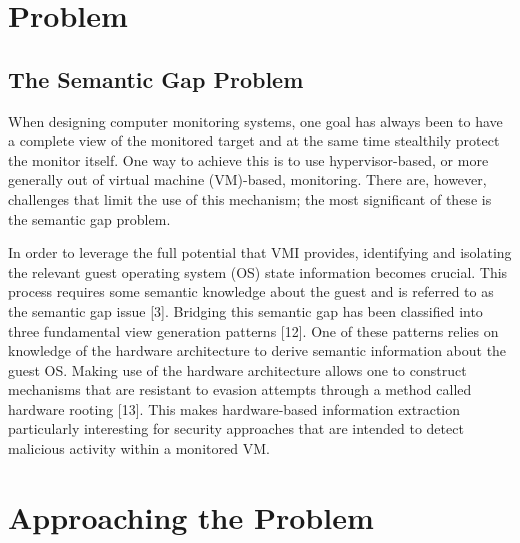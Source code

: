 \documentclass{report}
\begin{document}
\begin{spacing}{1.5}
\section{Problem}
\subsection{The Semantic Gap Problem}
When designing computer monitoring systems, one goal has always been to have a complete view of the
monitored target and at the same time stealthily protect the monitor itself. One way to achieve this is to
use hypervisor-based, or more generally out of virtual machine (VM)-based, monitoring. There are, however,
challenges that limit the use of this mechanism; the most significant of these is the semantic gap problem.



In order to leverage the full potential that VMI provides, identifying and
isolating the relevant guest operating system (OS) state information becomes
crucial. This process requires some semantic knowledge about the guest and is
referred to as the semantic gap issue [3]. Bridging this semantic gap has been
classified into three fundamental view generation patterns [12]. One of these
patterns relies on knowledge of the hardware architecture to derive semantic
information about the guest OS. Making use of the hardware architecture allows
one to construct mechanisms that are resistant to evasion attempts through a
method called hardware rooting [13]. This makes hardware-based information
extraction particularly interesting for security approaches that are intended to
detect malicious activity within a monitored VM.















\section{Approaching the Problem}


















\end{spacing}
\end{document}
